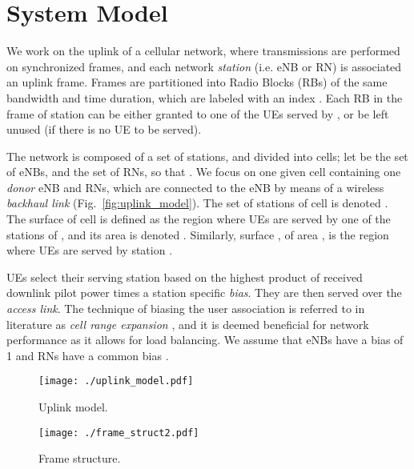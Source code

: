 \documentclass[draftcls,onecolumn]{IEEEtran}
\theoremstyle{plain}
\theoremstyle{definition}
\begin{document}
\section{System Model} \label{system_model}



We work on the uplink of a cellular network, where transmissions are performed on synchronized frames, and each network {\it station} (i.e. eNB or RN) is associated an uplink frame. Frames are partitioned into Radio Blocks (RBs) of the same bandwidth and time duration, which are labeled with an index . Each RB  in the frame of station  can be either granted to one of the UEs served by , or be left unused (if there is no UE to be served).  

The network is composed of a set  of  stations, and divided into cells; let  be the set of eNBs, and  the set of RNs, so that .
We focus on one given cell  containing one {\it donor} eNB \cite{36.814} and  RNs, which are connected to the eNB by means of a wireless {\it backhaul link} (Fig.~\ref{fig:uplink_model}). The set of stations of cell  is denoted . The surface  of cell  is defined as the region where UEs are served by one of the stations of , and its area is denoted . Similarly, surface , of area , is the region where UEs are served by station . 

UEs select their serving station based on the highest product of received downlink pilot power times a station specific {\it bias}. They are then served over the {\it access link}. The technique of biasing the user association is referred to in literature as {\it cell range expansion} \cite{Damnjanovic}, and it is deemed beneficial for network performance as it allows for load balancing. We assume that eNBs have a bias of 1 and RNs have a common bias .
\begin{figure}
\centering
\begin{minipage}{.47\textwidth}
\centering
\texttt{[image: ./uplink\_model.pdf]} 
\caption{Uplink model.}
\label{fig:uplink_model} 
\end{minipage}\hfill
\begin{minipage}{.47\textwidth}
\centering
\texttt{[image: ./frame\_struct2.pdf]}
 \caption{Frame structure.}
\label{fig:frame_struct} 
\end{minipage}
\end{figure}
\end{document}
